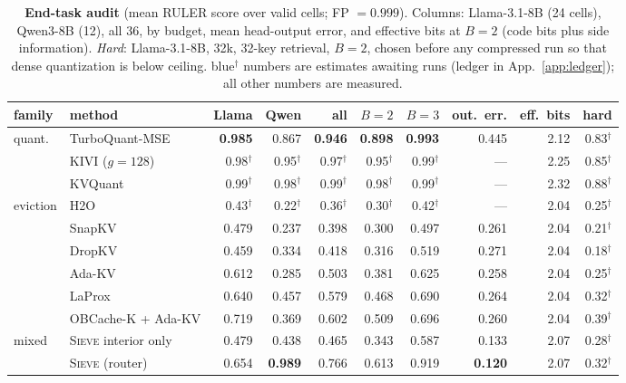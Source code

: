 \documentclass{article}
\newcommand{\est}[1]{{\color{estcol}#1$^{\dagger}$}}
\newcommand{\sieve}{\textsc{Sieve}}
\theoremstyle{definition}
\begin{document}
\begin{table}[t]
\centering
\footnotesize
\setlength{\tabcolsep}{2.6pt}
\caption{\textbf{End-task audit} (mean RULER score over valid cells; FP $=0.999$). Columns: Llama-3.1-8B (24 cells), Qwen3-8B (12), all 36, by budget, mean head-output error, and effective bits at $B=2$ (code bits plus side information). \emph{Hard}: Llama-3.1-8B, 32k, 32-key retrieval, $B=2$, chosen before any compressed run so that dense quantization is below ceiling. \est{blue} numbers are estimates awaiting runs (ledger in App.~\ref{app:ledger}); all other numbers are measured.}
\label{tab:endtask}
\begin{tabular}{@{}llrrrrrrrr@{}}
\toprule
family & method & Llama & Qwen & all & $B{=}2$ & $B{=}3$ & out.\ err. & eff.\ bits & hard \\
\midrule
\multirow{3}{*}{quant.} & TurboQuant-MSE & \textbf{0.985} & 0.867 & \textbf{0.946} & \textbf{0.898} & \textbf{0.993} & 0.445 & 2.12 & \est{0.83} \\
 & KIVI ($g{=}128$) & \est{0.98} & \est{0.95} & \est{0.97} & \est{0.95} & \est{0.99} & --- & 2.25 & \est{0.85} \\
 & KVQuant & \est{0.99} & \est{0.98} & \est{0.99} & \est{0.98} & \est{0.99} & --- & 2.32 & \est{0.88} \\
\midrule
\multirow{6}{*}{eviction} & H2O & \est{0.43} & \est{0.22} & \est{0.36} & \est{0.30} & \est{0.42} & --- & 2.04 & \est{0.25} \\
 & SnapKV & 0.479 & 0.237 & 0.398 & 0.300 & 0.497 & 0.261 & 2.04 & \est{0.21} \\
 & DropKV & 0.459 & 0.334 & 0.418 & 0.316 & 0.519 & 0.271 & 2.04 & \est{0.18} \\
 & Ada-KV & 0.612 & 0.285 & 0.503 & 0.381 & 0.625 & 0.258 & 2.04 & \est{0.25} \\
 & LaProx & 0.640 & 0.457 & 0.579 & 0.468 & 0.690 & 0.264 & 2.04 & \est{0.32} \\
 & OBCache-K + Ada-KV & 0.719 & 0.369 & 0.602 & 0.509 & 0.696 & 0.260 & 2.04 & \est{0.39} \\
\midrule
\multirow{2}{*}{mixed} & \sieve{} interior only & 0.479 & 0.438 & 0.465 & 0.343 & 0.587 & 0.133 & 2.07 & \est{0.28} \\
 & \sieve{} (router) & 0.654 & \textbf{0.989} & 0.766 & 0.613 & 0.919 & \textbf{0.120} & 2.07 & \est{0.32} \\
\bottomrule
\end{tabular}
\vspace{-2mm}
\end{table}
\end{document}

